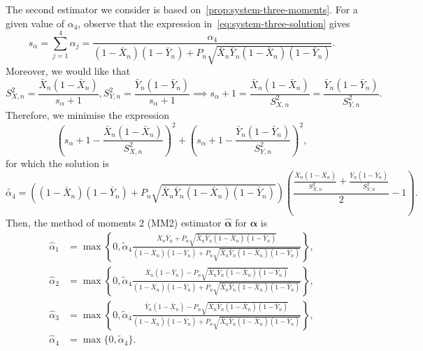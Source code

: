 \documentclass[a4paper, notitlepage, 10pt]{article}
\theoremstyle{definition}
\begin{document}
The second estimator we consider is based on~\autoref{prop:system-three-moments}.
For a given value of $\alpha_4$, observe that the expression in~\eqref{eq:system-three-solution} gives
\[
s_{\alpha} = \sum_{j=1}^4 \alpha_j = \frac{\alpha_4}{(1 - \bar{X}_n)(1 - \bar{Y}_n) + P_n\sqrt{\bar{X}_n \bar{Y}_n (1-\bar{X}_n)(1-\bar{Y}_n)}}.
\]
Moreover, we would like that 
\begin{equation}
    \label{eq:relation-v1v2}
    S_{X,n}^2 = \frac{\bar{X}_n(1 - \bar{X}_n)}{s_{\alpha}+1}, S_{Y,n}^2 = \frac{\bar{Y}_n(1 - \bar{Y}_n)}{s_{\alpha}+1} \implies s_{\alpha} + 1 = \frac{\bar{X}_n(1 - \bar{X}_n)}{S_{X,n}^2} = \frac{\bar{Y}_n(1 - \bar{Y}_n)}{S_{Y,n}^2}.
\end{equation}
Therefore, we minimise the expression 
\[
{\left(s_{\alpha} + 1 - \frac{\bar{X}_n(1 - \bar{X}_n)}{S_{X,n}^2}\right)}^2 + {\left(s_{\alpha} + 1 - \frac{\bar{Y}_n(1 - \bar{Y}_n)}{S_{Y,n}^2}\right)}^2, 
\]
for which the solution is 
\[
\tilde{\alpha_4} = \left((1 - \bar{X}_n)(1 - \bar{Y}_n) + P_n\sqrt{\bar{X}_n \bar{Y}_n (1-\bar{X}_n)(1-\bar{Y}_n)}\right)\left(\frac{\frac{\bar{X}_n(1 - \bar{X}_n)}{S_{X,n}^2} + \frac{\bar{Y}_n(1 - \bar{Y}_n)}{S_{Y,n}^2}}{2} - 1\right).
\]
Then, the method of moments 2 (MM2) estimator $\hat{\boldsymbol{\alpha}}$ for $\boldsymbol{\alpha}$ is
\begin{equation}
  \label{eq:mm2}
  \begin{aligned}
    \hat\alpha_1 &= \max\left\{0,  \tilde\alpha_4\frac{\bar{X}_n\bar{Y}_n + P_n\sqrt{\bar{X}_n\bar{Y}_n(1-\bar{X}_n)(1-\bar{Y}_n)}}{(1-\bar{X}_n)(1-\bar{Y}_n) + P_n\sqrt{\bar{X}_n\bar{Y}_n(1-\bar{X}_n)(1-\bar{Y}_n)}}\right\}, \\
    \hat\alpha_2 &= \max\left\{0, \tilde\alpha_4\frac{\bar{X}_n(1-\bar{Y}_n) - P_n\sqrt{\bar{X}_n\bar{Y}_n(1-\bar{X}_n)(1-\bar{Y}_n)}}{(1-\bar{X}_n)(1-\bar{Y}_n) + P_n\sqrt{\bar{X}_n\bar{Y}_n(1-\bar{X}_n)(1-\bar{Y}_n)}}\right\}, \\
    \hat\alpha_3 &= \max\left\{0, \tilde\alpha_4\frac{\bar{Y}_n(1-\bar{X}_n) - P_n\sqrt{\bar{X}_n\bar{Y}_n(1-\bar{X}_n)(1-\bar{Y}_n)}}{(1-\bar{X}_n)(1-\bar{Y}_n) + P_n\sqrt{\bar{X}_n\bar{Y}_n(1-\bar{X}_n)(1-\bar{Y}_n)}}\right\}, \\
    \hat\alpha_4 &= \max\{0, \tilde\alpha_4\}.
  \end{aligned}
\end{equation}
    
\end{document}
